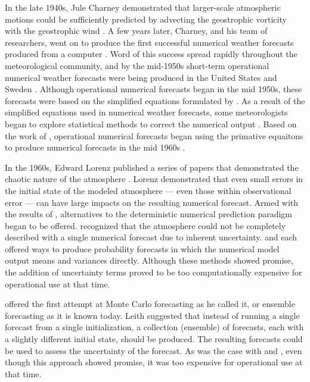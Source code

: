 In the late 1940s, Jule Charney demonstrated that larger-scale atmospheric motions could be sufficiently predicted by advecting the geostrophic vorticity with the geostrophic wind \citep{Charney1947}.
A few years later, Charney, and his team of researchers, went on to produce the first successful numerical weather forecasts produced from a computer \citep{Charney1950}.
Word of this success spread rapidly throughout the meteorological community, and by the mid-1950s short-term operational numerical weather forecasts were being produced in the United States and Sweden \citep{Lewis2005}.
Although operational numerical forecasts began in the mid 1950s, these forecasts were based on the simplified equations formulated by \cite{Charney1947}.
As a result of the simplified equations used in numerical weather forecasts, some meteorologists began to explore statistical methods to correct the numerical output \citep{Gleeson1961}.
Based on the work of \cite{Hinkelmann1951}, operational numerical forecasts began using the primative equaitons to produce numerical forecasts in the mid 1960s \citep{Lynch2008}.


In the 1960s, Edward Lorenz published a series of papers that demonstrated the chaotic nature of the atmosphere \citep{Lorenz1963, Lorenz1965, Lorenz1968}.
Lorenz demonstrated that even small errors in the initial state of the modeled atmosphere --- even those within observational error --- can have large impacts on the resulting numerical forecast.
Armed with the results of \cite{Lorenz1963, Lorenz1965, Lorenz1968}, alternatives to the deterministic numerical prediction paradigm began to be offered.
\cite{Epstein1969} recognized that the atmosphere could not be completely described with a single numerical forecast due to inherent uncertainty.
\cite{Epstein1969} and \cite{Gleeson1970} each offered ways to produce probability forecasts in which the numerical model output means and variances directly.
Although these methods showed promise, the addition of uncertainty terms proved to be too computationally expensive for operational use at that time.


\cite{Leith1974} offered the first attempt at Monte Carlo forecasting as he called it, or ensemble forecasting as it is known today.
Leith suggested that instead of running a single forecast from a single initialization, a collection (ensemble) of forecasts, each with a slightly different initial state, should be produced.
The resulting forecasts could be used to assess the uncertainty of the forecast.
As was the case with \cite{Epstein1969} and \cite{Gleeson1970}, even though this approach showed promise, it was too expensive for operational use at that time.








